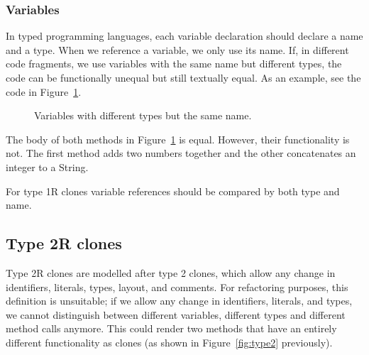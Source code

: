 \subsubsection{Variables}
In typed programming languages, each variable declaration should declare a name and a type. When we reference a variable, we only use its name. If, in different code fragments, we use variables with the same name but different types, the code can be functionally unequal but still textually equal. As an example, see the code in Figure~\ref{fig:type2variables}.

\begin{figure}[H]
\begin{parcolumns}{2}
\end{parcolumns}
\caption{Variables with different types but the same name.}
\label{fig:type2variables}
\end{figure}

The body of both methods in Figure~\ref{fig:type2variables} is equal. However, their functionality is not. The first method adds two numbers together and the other concatenates an integer to a String.

For type 1R clones variable references should be compared by both type and name.

\subsection{Type 2R clones} \label{sec:type2r}
Type 2R clones are modelled after type 2 clones, which allow any change in identifiers, literals, types, layout, and comments. For refactoring purposes, this definition is unsuitable; if we allow any change in identifiers, literals, and types, we cannot distinguish between different variables, different types and different method calls anymore. This could render two methods that have an entirely different functionality as clones (as shown in Figure~\ref{fig:type2} previously).

